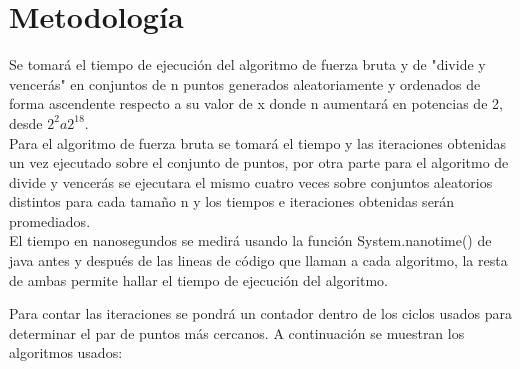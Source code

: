 \section{Metodología}
Se tomará el tiempo de ejecución del algoritmo de fuerza bruta y de "divide y vencerás" en conjuntos de n puntos generados aleatoriamente y ordenados de forma ascendente respecto a su valor de x donde n aumentará en potencias de 2, desde $2^{2} a 2^{18}$.\\

Para el algoritmo de fuerza bruta se tomará el tiempo y las iteraciones obtenidas un vez ejecutado sobre el conjunto de puntos, por otra parte para el algoritmo de divide y vencerás se ejecutara el mismo cuatro veces sobre conjuntos aleatorios distintos para cada tamaño n y los tiempos e iteraciones obtenidas serán promediados.\\

El tiempo en nanosegundos se medirá usando la función System.nanotime() de java antes y después de las lineas de código que llaman a cada algoritmo, la resta de ambas permite hallar el tiempo de ejecución del algoritmo.

Para contar las  iteraciones se pondrá un contador dentro de los ciclos usados para determinar el par de puntos más cercanos. A continuación se muestran los algoritmos usados:

